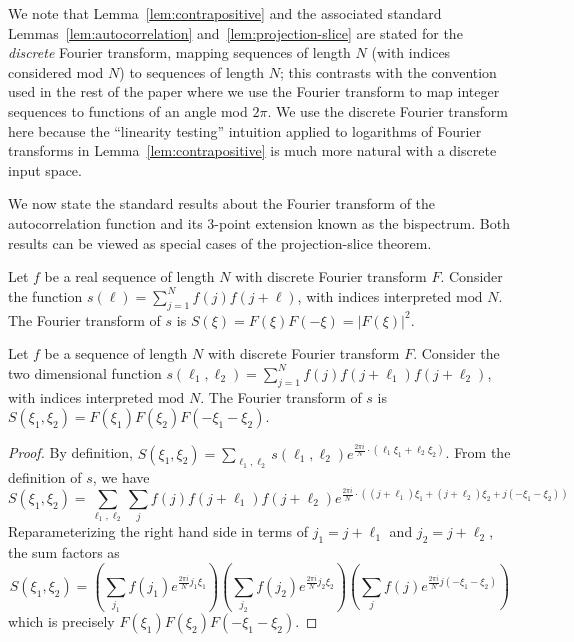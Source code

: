 \documentclass[11pt]{article}
\theoremstyle{plain}
\renewcommand{\mod}{\text{ mod }}
\begin{document}
We note that Lemma~\ref{lem:contrapositive} and the associated standard Lemmas~\ref{lem:autocorrelation} and~\ref{lem:projection-slice} are stated for the \emph{discrete} Fourier transform, mapping sequences of length $N$ (with indices considered mod $N$) to sequences of length $N$; this contrasts with the convention used in the rest of the paper where we use the Fourier transform to map integer sequences to functions of an angle mod $2\pi$. We use the discrete Fourier transform here because the ``linearity testing'' intuition applied to logarithms of Fourier transforms in  Lemma~\ref{lem:contrapositive} is much more natural with a discrete input space.

We now state the standard results about the Fourier transform of the autocorrelation function and its 3-point extension known as the bispectrum. Both results can be viewed as special cases of the projection-slice theorem.

\begin{lemma}\label{lem:autocorrelation}
Let $f$ be a real sequence of length $N$ with discrete Fourier transform $F$. Consider the function $s(\ell) = \sum_{j=1}^N f(j) f(j+\ell)$, with indices interpreted$\mod N$. The Fourier transform of $s$ is $S(\xi) = F(\xi)F(-\xi)=|F(\xi)|^2$.
\end{lemma}
\begin{lemma}\label{lem:projection-slice}
Let $f$ be a sequence of length $N$ with discrete Fourier transform $F$. Consider the two dimensional function $s(\ell_1,\ell_2) = \sum_{j=1}^N f(j) f(j+\ell_1)f(j+\ell_2)$, with indices interpreted$\mod N$. The Fourier transform of $s$ is $S(\xi_1,\xi_2) = F(\xi_1)F(\xi_2)F(-\xi_1-\xi_2)$.
\end{lemma}
\begin{proof}
    By definition, $S(\xi_1,\xi_2) = \sum_{\ell_1,\ell_2}  s(\ell_1,\ell_2) e^{\frac{2\pi i}{N} \cdot (\ell_1\xi_1 + \ell_2\xi_2)}$. From the definition of $s$, we have 
    \begin{equation*}
        S(\xi_1,\xi_2) = \sum_{\ell_1,\ell_2} \sum_j f(j) f(j+\ell_1)f(j+\ell_2) e^{\frac{2\pi i}{N} \cdot ((j+\ell_1)\xi_1 + (j+\ell_2)\xi_2 + j(-\xi_1 - \xi_2))} 
    \end{equation*}
    Reparameterizing the right hand side in terms of $j_1 = j + \ell_1$ and $j_2 = j + \ell_2$, the sum factors as
    \begin{equation*}
        S(\xi_1,\xi_2) = \left( \sum_{j_1} f(j_1) e^{\frac{2\pi i}{N} j_1\xi_1} \right) \left( \sum_{j_2} f(j_2) e^{\frac{2\pi i}{N} j_2\xi_2} \right) \left( \sum_{j} f(j) e^{\frac{2\pi i}{N} j(-\xi_1-\xi_2)} \right) 
    \end{equation*}
    which is precisely $F(\xi_1)F(\xi_2)F(-\xi_1-\xi_2)$. 
\end{proof}
\end{document}
